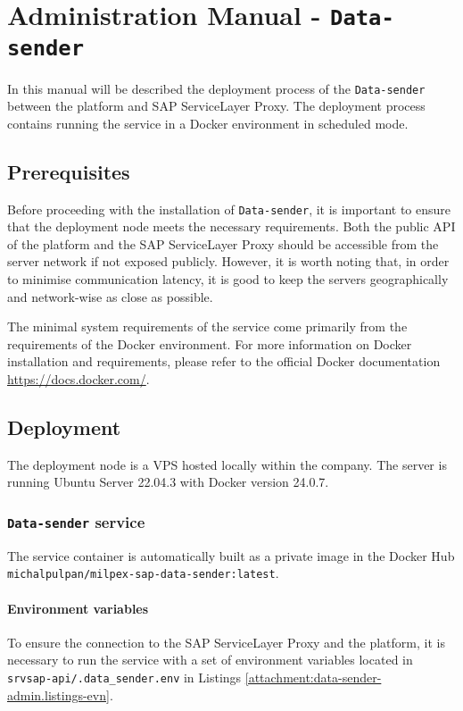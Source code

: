 \chapter{Administration Manual - \texttt{Data-sender}}
\label{attachments:admin-manual-data-sender}

In this manual will be described the deployment process of the \texttt{Data-sender} between the platform and SAP ServiceLayer Proxy.
The deployment process contains running the service in a Docker environment in scheduled mode.

\section{Prerequisites}
Before proceeding with the installation of \texttt{Data-sender}, it is important to ensure that the deployment node meets the necessary requirements.
Both the public API of the platform and the SAP ServiceLayer Proxy should be accessible from the server network if not exposed publicly.
However, it is worth noting that, in order to minimise communication latency, it is good to keep the servers geographically and network-wise as close as possible. 

The minimal system requirements of the service come primarily from the requirements of the Docker environment.
For more information on Docker installation and requirements, please refer to the official Docker documentation \url{https://docs.docker.com/}.

\section{Deployment}
\label{sec:admin-manual-sap.deployment}
The deployment node is a \ac{VPS} hosted locally within the company.
The server is running Ubuntu Server 22.04.3 with Docker version 24.0.7.

\subsection{\texttt{Data-sender} service}
The service container is automatically built as a private image in the Docker Hub \texttt{michalpulpan/milpex-sap-data-sender:latest}.

\subsubsection{Environment variables}
To ensure the connection to the SAP ServiceLayer Proxy and the platform, it is necessary to run the service with a set of environment variables located in \texttt{\/srv\/sap-api/.data\_sender.env} in Listings \ref{attachment:data-sender-admin.listings-evn}.

